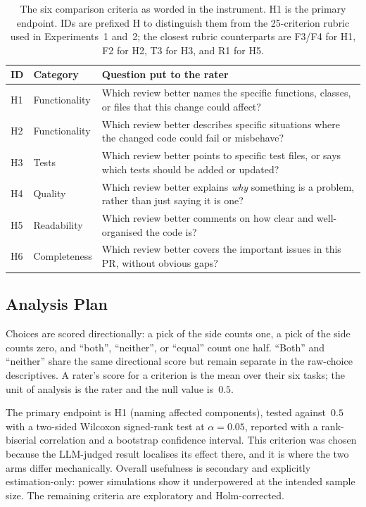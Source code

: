 \begin{table}[htbp]
    \centering
    \caption{The six comparison criteria as worded in the instrument. H1 is
             the primary endpoint. IDs are prefixed H to distinguish them
             from the 25-criterion rubric used in Experiments~1 and~2; the
             closest rubric counterparts are F3/F4 for H1, F2 for H2, T3 for
             H3, and R1 for H5.}
    \label{tab:study-criteria}
    \small
    \begin{tabular}{llp{7.4cm}}
        \toprule
        ID & Category & Question put to the rater \\
        \midrule
        H1 & Functionality  & Which review better names the specific functions, classes, or files that this change could affect? \\
        H2 & Functionality  & Which review better describes specific situations where the changed code could fail or misbehave? \\
        H3 & Tests          & Which review better points to specific test files, or says which tests should be added or updated? \\
        H4 & Quality        & Which review better explains \emph{why} something is a problem, rather than just saying it is one? \\
        H5 & Readability    & Which review better comments on how clear and well-organised the code is? \\
        H6 & Completeness   & Which review better covers the important issues in this PR, without obvious gaps? \\
        \bottomrule
    \end{tabular}
\end{table}

\subsection{Analysis Plan}

Choices are scored directionally: a pick of the \kg{} side counts one, a pick
of the \baseline{} side counts zero, and ``both'', ``neither'', or ``equal''
count one half. ``Both'' and ``neither'' share the same directional score but
remain separate in the raw-choice descriptives. A rater's score for a criterion
is the mean over their six tasks; the unit of analysis is the rater and the
null value is~$0.5$.

The primary endpoint is H1 (naming affected components), tested against~$0.5$
with a two-sided Wilcoxon signed-rank test at $\alpha = 0.05$, reported with
a rank-biserial correlation and a bootstrap confidence interval. This
criterion was chosen because the LLM-judged result localises its effect
there, and it is where the two arms differ mechanically. Overall usefulness
is secondary and explicitly estimation-only: power simulations show it
underpowered at the intended sample size. The remaining criteria are
exploratory and Holm-corrected.

